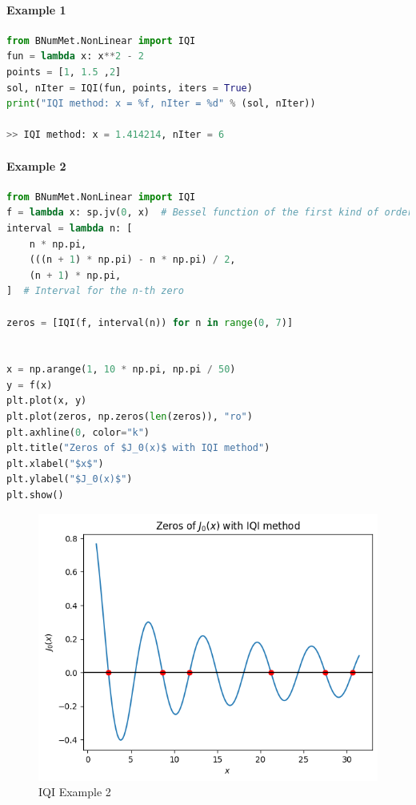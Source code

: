 \paragraph{Example 1}{
\begin{lstlisting}[language=Python]
from BNumMet.NonLinear import IQI
fun = lambda x: x**2 - 2
points = [1, 1.5 ,2]
sol, nIter = IQI(fun, points, iters = True)
print("IQI method: x = %f, nIter = %d" % (sol, nIter))

>> IQI method: x = 1.414214, nIter = 6
\end{lstlisting}
}
\paragraph{Example 2}{
\begin{lstlisting}[language=Python]
from BNumMet.NonLinear import IQI
f = lambda x: sp.jv(0, x)  # Bessel function of the first kind of order 0
interval = lambda n: [
    n * np.pi,
    (((n + 1) * np.pi) - n * np.pi) / 2,
    (n + 1) * np.pi,
]  # Interval for the n-th zero

zeros = [IQI(f, interval(n)) for n in range(0, 7)]


x = np.arange(1, 10 * np.pi, np.pi / 50)
y = f(x)
plt.plot(x, y)
plt.plot(zeros, np.zeros(len(zeros)), "ro")
plt.axhline(0, color="k")
plt.title("Zeros of $J_0(x)$ with IQI method")
plt.xlabel("$x$")
plt.ylabel("$J_0(x)$")
plt.show()
\end{lstlisting}

\begin{figure}[H]
    \centering
    \includegraphics{Include/Images/Thesis/Documentation/NonLinear/IQI Example 2.png}
    \caption{IQI Example 2}
    \label{fig:IQI Example 2}
\end{figure}
}